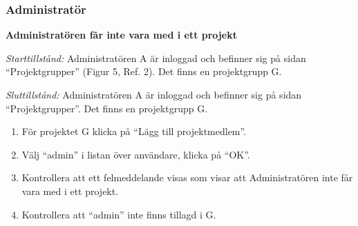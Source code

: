 \documentclass[a4paper]{article}
\begin{document}
\subsubsection{Administratör}
\begin{FT}
\item \textbf{Administratören får inte vara med i ett projekt}

\emph{Starttillstånd:} Administratören A är inloggad och befinner sig på sidan ``Projektgrupper'' (Figur 5, Ref. 2). Det finns en projektgrupp G.

\emph{Sluttillstånd:} Administratören A är inloggad och befinner sig på sidan ``Projektgrupper''. Det finns en projektgrupp G.

\begin{enumerate}
\item För projektet G klicka på ``Lägg till projektmedlem''.
\item Välj ``admin'' i listan över användare, klicka på ``OK''.
\item Kontrollera att ett felmeddelande visas som visar att Administratören inte får vara med i ett projekt.
\item Kontrollera att ``admin'' inte finns tillagd i G.
\end{enumerate}
\end{FT}
\end{document}
